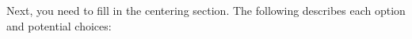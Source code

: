 \documentclass[letterpaper,12pt]{article}
\begin{document}

Next, you need to fill in the centering section. The following
describes each option and potential choices:
\end{document}

